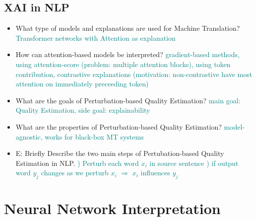 \documentclass{report}
\newcommand{\asw}[2][teal]{}
\renewcommand{\asw}[2][teal]{\textcolor{#1}{#2}}
\begin{document}
		\subsection{XAI in NLP}
		
		\begin{itemize}
		\item What type of models and explanations are used for Machine Translation?
		\asw{\newline Transformer networks with Attention as explanation}
		\item How can attention-based models be interpreted?
		\asw{\newline gradient-based methods, using attention-score (problem: multiple attention blocks), using token contribution, contrastive explanations (motivation: non-contrastive have most attention on immediately preceeding token)}
		\item What are the goals of Perturbation-based Quality Estimation?
		\asw{\newline main goal: Quality Estimation, side goal: explainability}
		\item What are the properties of Perturbation-based Quality Estimation?
		\asw{\newline model-agnostic, works for black-box MT systems}
		\item E: Briefly Describe the two main steps of Pertubation-based Quality Estimation in NLP.
		\asw{) Perturb each word $x_i$ in source sentence
			\newline 2) if output word $y_j$ changes as we perturb $x_i$ $\Rightarrow$ $x_i$ influences $y_j$}
		\end{itemize}
	\newpage
	
	\section{Neural Network Interpretation}
	
\end{document}
